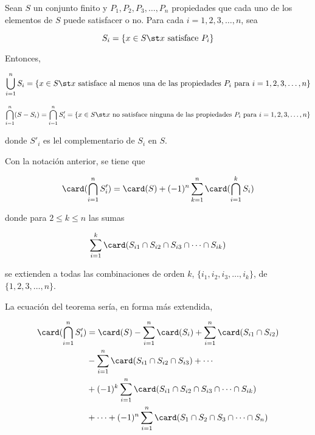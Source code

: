 



\iffalse
Sean $S$ un conjunto finito y $P_1, P_2, P_3, \ldots, P_n$ propiedades que
cada uno de los elementos de $S$ puede satisfacer o no. Para cada $i = 1, 2,
3, \ldots, n$, sea

$$ S_i = \{x \in S \st x \ \text{satisface} \ P_i\} $$

Entonces,

$$ \bigcup_{i=1}^n S_i = \{x \in S \st x \ \text{satisface al menos una de
las propiedades} \ P_i \ \text{para} \ i=1, 2, 3, \ldots, n\} $$

$$ \bigcap_{i=1}^n (S - S_i) = \bigcap_{i=1}^n S'_i = \{x \in S \st x \
\text{no satisface ninguna de las propiedades} \ P_i \ \text{para} \ i=1, 2,
3, \ldots, n\} $$

\noindent donde $S'_i$ es lel complementario de $S_i$ en $S$.




\begin{theorem}
Con la notación anterior, se tiene que

$$ \card(\bigcap_{i=1}^n S'_i) = \card(S) + ({-1})^n \sum_{k=1}^n
\card(\bigcap_{i=1}^k S_i) $$

\noindent donde para $2 \leq k \leq n$ las sumas

$$ \sum_{i=1}^k \card(S_{i1} \cap S_{i2} \cap S_{i3} \cap \cdots \cap
S_{ik}) $$

\noindent se extienden a todas las combinaciones de orden $k$, $\{i_1, i_2,
i_3, \ldots, i_k\}$, de $\{1, 2, 3, \ldots, n\}$.
\end{theorem}

La ecuación del teorema sería, en forma más extendida,

\begin{alignat*}{2}
  \card(\bigcap_{i=1}^n S'_i)
    &= \card(S) - \sum_{i=1}^n \card(S_i) + \sum_{i=1}^n \card(S_{i1} \cap S_{i2}) \\
    &- \sum_{i=1}^n \card(S_{i1} \cap S_{i2} \cap S_{i3}) + \cdots \\
    &+ ({-1})^k \sum_{i=1}^n \card(S_{i1} \cap S_{i2} \cap S_{i3} \cap \cdots \cap S_{ik}) \\
    &+ \cdots + ({-1})^n \sum_{i=1}^n \card(S_1 \cap S_2 \cap S_3 \cap \cdots \cap S_n)
\end{alignat*}

